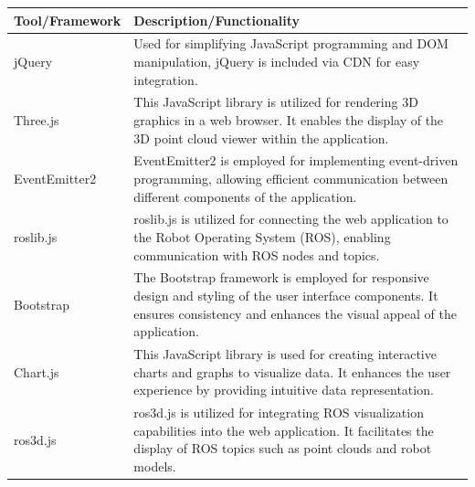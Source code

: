 \begin{table}[H]
	\centering
	\begin{threeparttable}
		\label{ch3:tab:tools-frameworks}
		\begin{tabular}{l p{9cm} }
			\toprule
			\textbf{Tool/Framework} & \textbf{Description/Functionality}                                                                                                                                                \\ \midrule
			jQuery                  & Used for simplifying JavaScript programming and DOM manipulation, jQuery is included via CDN for easy integration.                                                                \\ \midrule
			Three.js                & This JavaScript library is utilized for rendering 3D graphics in a web browser. It enables the display of the 3D point cloud viewer within the application.                       \\ \midrule
			EventEmitter2           & EventEmitter2 is employed for implementing event-driven programming, allowing efficient communication between different components of the application.                            \\ \midrule
			roslib.js               & roslib.js is utilized for connecting the web application to the Robot Operating System (ROS), enabling communication with ROS nodes and topics.                                   \\ \midrule
			Bootstrap               & The Bootstrap framework is employed for responsive design and styling of the user interface components. It ensures consistency and enhances the visual appeal of the application. \\ \midrule
			Chart.js                & This JavaScript library is used for creating interactive charts and graphs to visualize data. It enhances the user experience by providing intuitive data representation.         \\ \midrule
			ros3d.js                & ros3d.js is utilized for integrating ROS visualization capabilities into the web application. It facilitates the display of ROS topics such as point clouds and robot models.     \\ \bottomrule
		\end{tabular}
	\end{threeparttable}
\end{table}


